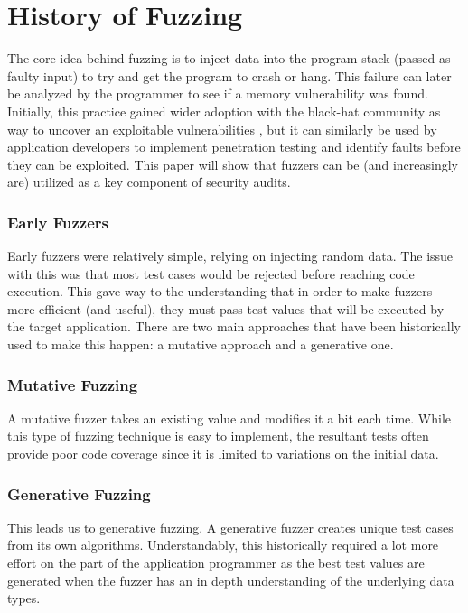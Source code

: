 \chapter{History of Fuzzing}

The core idea behind fuzzing is to inject data into the program stack (passed as faulty input) to try and get the program to crash or hang\cite{fuzz-by-number}. This failure can later be analyzed by the programmer to see if a memory vulnerability was found. Initially, this practice gained wider adoption with the black-hat community as way to uncover an exploitable vulnerabilities \cite{fuzzing-ppf}, but it can similarly be used by application developers to implement penetration testing and identify faults before they can be exploited. This paper will show that fuzzers can be (and increasingly are) utilized as a key component of security audits.

\subsection{Early Fuzzers}

Early fuzzers were relatively simple, relying on injecting random data. The issue with this was that most test cases would be rejected before reaching code execution\cite{mil-fuzz}. This gave way to the understanding that in order to make fuzzers more efficient (and useful), they must pass test values that will be executed by the target application. There are two main approaches that have been historically used to make this happen: a mutative approach and a generative one\cite{mil-fuzz}.

\subsection{Mutative Fuzzing}

A mutative fuzzer takes an existing value and modifies it a bit each time. While this type of fuzzing technique is easy to implement, the resultant tests often provide poor code coverage \cite{fuzzing-ppf} since it is limited to variations on the initial data.

\subsection{Generative Fuzzing}

This leads us to generative fuzzing. A generative fuzzer creates unique test cases from its own algorithms. Understandably, this historically required a lot more effort on the part of the application programmer as the best test values are generated when the fuzzer has an in depth understanding of the underlying data types\cite{fuzzing-ppf}.

